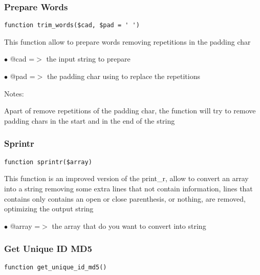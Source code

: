 \documentclass[a4paper]{article}
\begin{document}
\hypertarget{toc239}{}
\subsubsection{Prepare Words}

\begin{lstlisting}
function trim_words($cad, $pad = ' ')
\end{lstlisting}

This function allow to prepare words removing repetitions in the padding char

\begin{compactitem}
\item[\color{myblue}$\bullet$] @cad =$>$ the input string to prepare
\item[\color{myblue}$\bullet$] @pad =$>$ the padding char using to replace the repetitions
\end{compactitem}

Notes:

Apart of remove repetitions of the padding char, the function will try to
remove padding chars in the start and in the end of the string

\hypertarget{toc240}{}
\subsubsection{Sprintr}

\begin{lstlisting}
function sprintr($array)
\end{lstlisting}

This function is an improved version of the print\_r, allow to convert an
array into a string removing some extra lines that not contain information,
lines that contains only contains an open or close parenthesis, or nothing,
are removed, optimizing the output string

\begin{compactitem}
\item[\color{myblue}$\bullet$] @array =$>$ the array that do you want to convert into string
\end{compactitem}

\hypertarget{toc241}{}
\subsubsection{Get Unique ID MD5}

\begin{lstlisting}
function get_unique_id_md5()
\end{lstlisting}
\end{document}
